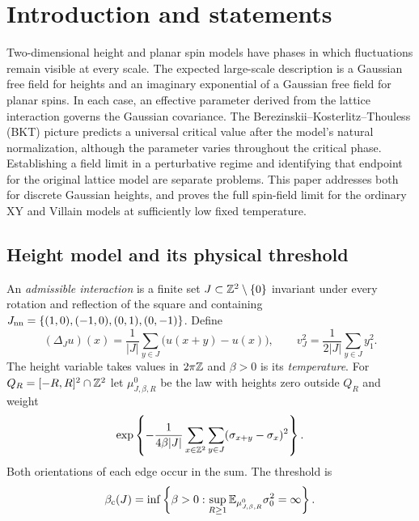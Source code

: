 \begin{abstract}
We prove Gaussian scaling limits for the two-dimensional discrete Gaussian
height model throughout its rough phase, including the physical roughening
threshold, for every finite square-symmetric interaction set containing the
nearest neighbors. After the natural lattice normalization, the critical
effective temperature has the universal value \(8\pi\).
For the ordinary nearest-neighbor Villain and XY models at sufficiently low
fixed temperatures, we also prove that their Green-function-normalized
spin fields converge to the imaginary exponential of a Dirichlet Gaussian
free field.
\end{abstract}

\section{Introduction and statements}
\label{main:introduction}

Two-dimensional height and planar spin models have phases in which
fluctuations remain visible at every scale.  The expected large-scale
description is a Gaussian free field for heights and an imaginary
exponential of a Gaussian free field for planar spins.  In each case,
an effective parameter derived from the lattice interaction governs the
Gaussian covariance.  The Berezinskii--Kosterlitz--Thouless (BKT) picture
predicts a universal critical value after the model's natural
normalization, although the parameter varies throughout the critical
phase.  Establishing a field
limit in a perturbative regime and identifying that endpoint for the
original lattice model are separate problems.  This paper addresses
both for discrete Gaussian heights, and proves the full spin-field
limit for the ordinary XY and Villain models at sufficiently low fixed
temperature.

\subsection{Height model and its physical threshold}

An \emph{admissible interaction} is a finite set
$J\subset\mathbb Z^2\setminus\{0\}$ invariant under every rotation and reflection
of the square and containing
$J_{\mathrm{nn}}=\{(1,0),(-1,0),(0,1),(0,-1)\}$.  Define
\begin{equation}\label{main:laplacian}
 (\Delta_Ju)(x)=\frac1{|J|}\sum_{y\in J}\bigl(u(x+y)-u(x)\bigr),
 \qquad
 v_J^2=\frac1{2|J|}\sum_{y\in J}y_1^2.
\end{equation}
The height variable takes values in $2\pi\mathbb Z$ and $\beta>0$ is its
\emph{temperature}.  For $Q_R=[-R,R]^2\cap\mathbb Z^2$ let
$\mu^0_{J,\beta,R}$ be the law with heights zero outside $Q_R$ and weight
\begin{equation}\label{main:zero-law}
 \exp\left\{-\frac1{4\beta|J|}
    \sum_{x\in\mathbb Z^2}\sum_{y\in J}
        (\sigma_{x+y}-\sigma_x)^2\right\}.
\end{equation}
Both orientations of each edge occur in the sum.  The threshold is
\begin{equation}\label{main:physical-threshold}
 \beta_{\mathrm c}(J)=\inf\left\{\beta>0:
       \sup_{R\ge1}\mathbb E_{\mu^0_{J,\beta,R}}\sigma_0^2=\infty\right\}.
\end{equation}

